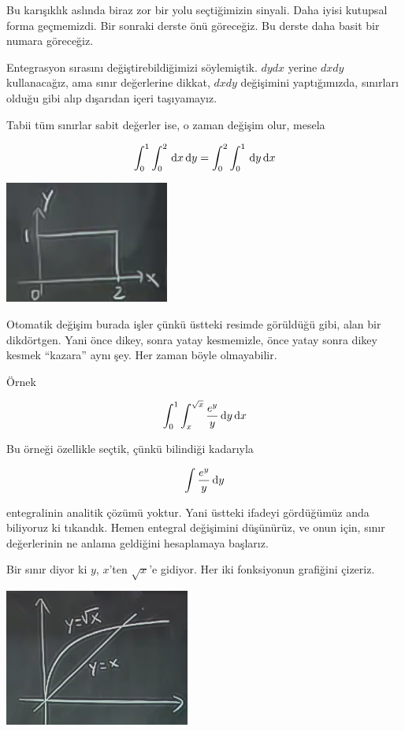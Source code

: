\documentclass[12pt,fleqn]{article}\usepackage{../../common}
\begin{document}
Bu karışıklık aslında biraz zor bir yolu seçtiğimizin sinyali. Daha iyisi
kutupsal forma geçmemizdi. Bir sonraki derste önü göreceğiz. Bu derste daha
basit bir numara göreceğiz.

Entegrasyon sırasını değiştirebildiğimizi söylemiştik. $dy dx$ yerine $dx dy$
kullanacağız, ama sınır değerlerine dikkat, $dx dy$ değişimini yaptığımızda,
sınırları olduğu gibi alıp dışarıdan içeri taşıyamayız.

Tabii tüm sınırlar sabit değerler ise, o zaman değişim olur, mesela

$$
\int_0^1 \int_0^2 \,\mathrm{d} x \,\mathrm{d} y = \int_0^2 \int_0^1 \,\mathrm{d} y \,\mathrm{d} x
$$

\includegraphics[height=4cm]{16_12.png}

Otomatik değişim burada işler çünkü üstteki resimde görüldüğü gibi, alan bir
dikdörtgen. Yani önce dikey, sonra yatay kesmemizle, önce yatay sonra dikey
kesmek ``kazara'' aynı şey. Her zaman böyle olmayabilir.

Örnek 

$$ \int_0^1 \int_x^{\sqrt{x}} \frac{e^y}{y} \,\mathrm{d} y \,\mathrm{d} x $$

Bu örneği özellikle seçtik, çünkü bilindiği kadarıyla 

$$ \int \frac{e^y}{y} \,\mathrm{d} y $$

entegralinin analitik çözümü yoktur. Yani üstteki ifadeyi gördüğümüz anda
biliyoruz ki tıkandık. Hemen entegral değişimini düşünürüz, ve onun için,
sınır değerlerinin ne anlama geldiğini hesaplamaya başlarız. 

Bir sınır diyor ki $y$, $x$'ten $\sqrt{x}$'e gidiyor. Her iki fonksiyonun
grafiğini çizeriz. 

\includegraphics[height=4.5cm]{16_13.png}
\end{document}
